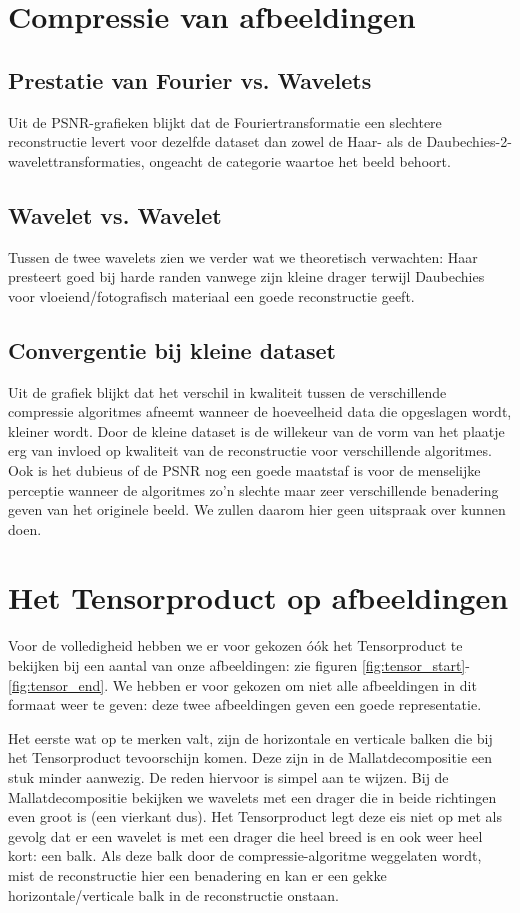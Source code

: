 \section{Compressie van afbeeldingen}

\subsection{Prestatie van Fourier vs. Wavelets}
Uit de PSNR-grafieken blijkt dat de Fouriertransformatie een slechtere reconstructie levert voor 
dezelfde dataset dan zowel de Haar- als de Daubechies-2-wavelettransformaties, 
ongeacht de categorie waartoe het beeld behoort.

\subsection{Wavelet vs. Wavelet}
Tussen de twee wavelets zien we verder wat we theoretisch verwachten: Haar presteert goed bij harde randen
vanwege zijn kleine drager terwijl Daubechies voor vloeiend/fotografisch materiaal een goede reconstructie geeft.

\subsection{Convergentie bij kleine dataset}
Uit de grafiek blijkt dat het verschil in kwaliteit tussen de verschillende compressie algoritmes afneemt wanneer
de hoeveelheid data die opgeslagen wordt, kleiner wordt. 
Door de kleine dataset is de willekeur van de vorm van het plaatje erg van invloed op kwaliteit van de reconstructie 
voor verschillende algoritmes. 
Ook is het dubieus of de PSNR nog een goede maatstaf is voor de menselijke perceptie wanneer de algoritmes
zo'n slechte maar zeer verschillende benadering geven van het originele beeld.
We zullen daarom hier geen uitspraak over kunnen doen.

\section{Het Tensorproduct op afbeeldingen}
Voor de volledigheid hebben we er voor gekozen \'o\'ok het Tensorproduct te bekijken bij een aantal 
van onze afbeeldingen: zie figuren \ref{fig:tensor_start}-\ref{fig:tensor_end}. We hebben er voor 
gekozen om niet alle afbeeldingen in dit formaat weer te geven: deze twee afbeeldingen geven een goede representatie.

Het eerste wat op te merken valt, zijn de horizontale en verticale balken die bij het Tensorproduct 
tevoorschijn komen. Deze zijn in de Mallatdecompositie een stuk minder aanwezig. De reden 
hiervoor is simpel aan te wijzen. Bij de Mallatdecompositie bekijken we wavelets met een 
drager die in beide richtingen even groot is (een vierkant dus). Het Tensorproduct legt deze eis 
niet op met als gevolg dat er een wavelet is met een drager die heel breed is en ook weer 
heel kort: een balk. Als deze balk door de compressie-algoritme weggelaten wordt, mist de 
reconstructie hier een benadering en kan er een gekke horizontale/verticale balk in de reconstructie onstaan.

